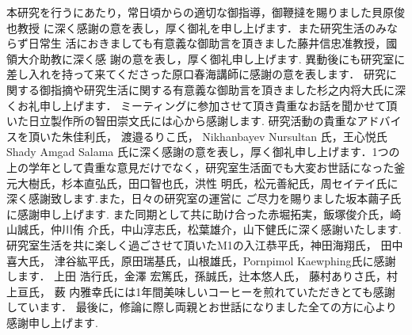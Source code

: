 \begin{shaji}
  \addcontentsline{}{}{}
 本研究を行うにあたり，常日頃からの適切な御指導，御鞭撻を賜りました貝原俊也教授
 に深く感謝の意を表し，厚く御礼を申し上げます．また研究生活のみならず日常生
 活におきましても有意義な御助言を頂きました藤井信忠准教授，國領大介助教に深く感
 謝の意を表し，厚く御礼申し上げます.
 異動後にも研究室に差し入れを持って来てくださった原口春海講師に感謝の意を表します．
 研究に関する御指摘や研究生活に関する有意義な御助言を頂きました杉之内将大氏に深くお礼申し上げます．
 ミーティングに参加させて頂き貴重なお話を聞かせて頂いた日立製作所の智田崇文氏には心から感謝します.
研究活動の貴重なアドバイスを頂いた朱佳利氏， 渡邉るりこ氏， Nikhanbayev Nursultan 氏，王心悦氏 Shady Amgad Salama
氏に深く感謝の意を表し，厚く御礼申し上げます．1つの上の学年として貴重な意見だけでなく，研究室生活面でも大変お世話になった釜元大樹氏，杉本直弘氏，田口智也氏，洪性 明氏，松元善紀氏，周セイテイ氏に深く感謝致します.また，日々の研究室の運営に ご尽力を賜りました坂本繭子氏に感謝申し上げます.
また同期として共に助け合った赤堀拓実，飯塚俊介氏，崎山誠氏，仲川侑 介氏，中山淳志氏，松葉雄介，山下健氏に深く感謝いたします.
研究室生活を共に楽しく過ごさせて頂いたM1の入江恭平氏，神田海翔氏， 田中 喜大氏，
津谷紘平氏，原田瑞基氏，山根雄氏，Pornpimol Kaewphing氏に感謝します．
上田 浩行氏，金澤 宏篤氏，孫誠氏，辻本悠人氏， 藤村ありさ氏，村上亘氏， 薮
内雅幸氏には1年間美味しいコーヒーを煎れていただきとても感謝しています．
最後に，修論に際し両親とお世話になりました全ての方に心より感謝申し上げます. 
\end{shaji}


